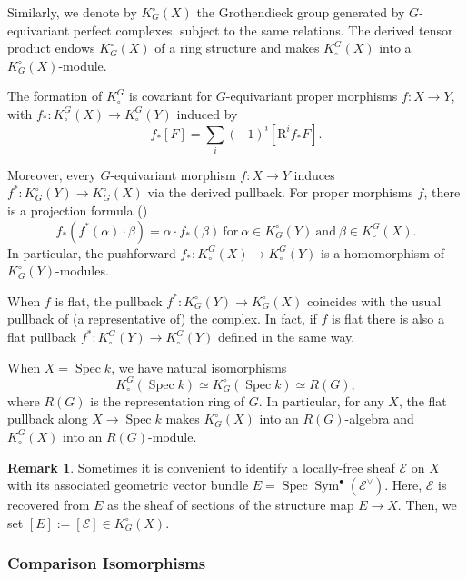 \documentclass[12pt]{amsart}
\newcommand\spec{\operatorname{Spec}}
\newcommand{\sE}{\mathscr{E}}
\newcommand{\Sym}{\operatorname{Sym}}
\newcommand{\Kring}{K^{\circ}}
\newcommand{\Kgroup}{K_{\circ}}
\theoremstyle{definition}
\newtheorem{Rmk}[theorem]{Remark}
\begin{document}
Similarly, we denote by $K_G^{\circ}(X)$ the Grothendieck group generated by $G$-equivariant perfect complexes, subject to the same relations. The derived tensor product endows $\Kring_G(X)$ of a ring structure and makes $\Kgroup^G(X)$ into a $\Kring_G(X)$-module.

The formation of $\Kgroup^G$ is covariant for $G$-equivariant proper morphisms $f:X\rightarrow Y$, with $f_*:\Kgroup^G(X)\rightarrow\Kgroup^G(Y)$ induced by
\[
    f_*[F]=\sum_{i}(-1)^i[\mathrm{R}^if_*F].
\]

Moreover, every $G$-equivariant morphism $f:X \to Y$ induces $f^*:\Kring_G(Y)\rightarrow\Kring_G(X)$ via the derived pullback.
For proper morphisms $f$, there is a projection formula (\cite[\href{https://stacks.math.columbia.edu/tag/01E8}{Tag 01E8}]{stacks-project})
\begin{equation}\label{eqn: Projection Formula}
f_*( f^*(\alpha) \cdot \beta)= \alpha \cdot f_*(\beta) \ \text{for} \ \alpha \in \Kring_G(Y) \ \text{and} \  \beta \in \Kgroup^G(X).
\end{equation}
In particular, the pushforward $f_*:\Kgroup^G(X) \to \Kgroup^G(Y)$ is a homomorphism of $\Kring_G(Y)$-modules.

When $f$ is flat, the pullback $f^*: \Kring_G(Y)\rightarrow\Kring_G(X)$ coincides with the usual pullback of (a representative of) the complex. In fact, if $f$ is flat there is also a flat pullback $f^*:\Kgroup^G(Y) \to \Kgroup^G(Y)$ defined in the same way.

When $X=\spec k$, we have natural isomorphisms
\[
    \Kgroup^G(\spec k)\simeq\Kring_G(\spec k)\simeq R(G),
\]
where $R(G)$ is the representation ring of $G$. In particular, for any $X$, the flat pullback along $X\rightarrow\spec k$ makes $\Kring_G(X)$ into an $R(G)$-algebra and $\Kgroup^G(X)$ into an $R(G)$-module.

\begin{Rmk}\label{rmk: vector bundles vs locally-free sheaves}
    Sometimes it is convenient to identify a locally-free sheaf $\sE$ on $X$ with its associated geometric vector bundle $E=\spec\Sym^{\bullet}(\sE^\vee)$. Here, $\sE$ is recovered from $E$ as the sheaf of sections of the structure map $E\rightarrow X$. Then, we set $[E]:=[\sE]\in\Kring_G(X)$.
\end{Rmk}

\subsubsection{Comparison Isomorphisms} \label{sec: comparison isomorphisms}
\end{document}
